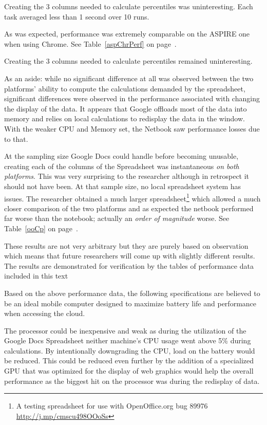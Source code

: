 Creating the 3 columns needed to calculate percentiles was uninteresting.  Each
task averaged less than 1 second over 10 runs.

As was expected, performance was extremely comparable on the ASPIRE one when
using Chrome. See Table~\ref{aspChrPerf} on page~\pageref{aspChrPerf}.



Creating the 3 columns needed to calculate percentiles remained uninteresting.

As an aside: while no significant difference at all was observed between the
two platforms' ability to compute the calculations demanded by the spreadsheet,
significant differences were observed in the performance associated with
changing the display of the data.  It appears that Google offloads most of the
data into memory and relies on local calculations to redisplay the data in the
window.  With the weaker CPU and Memory set, the Netbook saw performance losses
due to that.

At the sampling size Google Docs could handle before becoming unusable, creating
each of the columns of the Spreadsheet was instantaneous \emph{on both
  platforms}.  This was very surprising to the researcher although in retrospect
it should not have been.  At that sample size, no local spreadsheet system has
issues.  The researcher obtained a much larger spreadsheet\footnote{A testing
  spreadsheet for use with OpenOffice.org bug 89976
  \url{http://j.mp/cmscu498OOoSs}} which allowed a much closer comparison of the
two platforms and as expected the netbook performed far worse than the notebook;
actually an \emph{order of magnitude} worse. See Table~\ref{ooCp} on
page~\pageref{ooCp}.



These results are not very arbitrary but they are purely based on observation
which means that future researchers will come up with slightly different
results.  The results are demonstrated for verification by the tables of
performance data included in this text

Based on the above performance data, the following specifications are believed
to be an ideal mobile computer designed to maximize battery life and performance
when accessing the cloud.

The processor could be inexpensive and weak as during the utilization of the
Google Docs Spreadsheet neither machine's CPU usage went above 5\% during
calculations.  By intentionally downgrading the CPU, load on the battery would
be reduced.  This could be reduced even further by the addition of a specialized
GPU that was optimized for the display of web graphics would help the overall
performance as the biggest hit on the processor was during the redisplay of
data.

